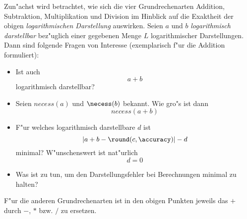 Zun"achst wird betrachtet, wie sich die vier Grundrechenarten Addition,
Subtraktion, Multiplikation und Division im Hinblick auf die Exaktheit
der obigen {\em logarithmischen Darstellung} auswirken. Seien $a$ und $b$
{\em logarithmisch darstellbar} bez"uglich einer gegebenen Menge $L$
logarithmischer Darstellungen. Dann sind folgende Fragen von Interesse
(exemplarisch f"ur die Addition formuliert):
\begin{itemize}
    \item Ist auch \[ a+b \] logarithmisch darstellbar?
    \item Seien $necess(a)$ und $\necess(b)$ bekannt.
          Wie gro"s ist dann \[ necess(a+b) \]
    \item F"ur welches logarithmisch
          darstellbare $d$ ist \[ |a+b-\round(c,\accuracy)|-d \]
          minimal? W"unschenswert ist nat"urlich \[ d=0 \]
    \item Was ist zu tun, um den Darstellungsfehler bei Berechnungen
          minimal zu halten?
\end{itemize}
F"ur die anderen Grundrechenarten ist in den obigen Punkten jeweils das
$+$ durch $-$, $*$ bzw. $/$ zu ersetzen.

